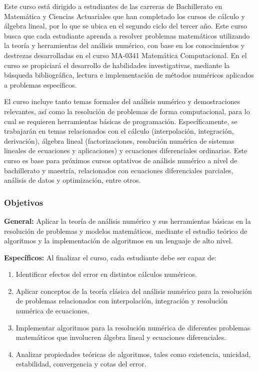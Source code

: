 \begin{refsection}
Este curso está dirigido a estudiantes de las carreras de Bachillerato en Matemática y Ciencias Actuariales que han completado los cursos de cálculo y álgebra lineal, por lo que se ubica en el segundo ciclo del tercer año. Este curso busca que cada estudiante aprenda a resolver problemas matemáticos utilizando la teoría y herramientas del análisis numérico, con base en los conocimientos y destrezas desarrolladas en el curso MA-0341 Matemática Computacional. En el curso se propiciará el desarrollo de habilidades investigativas, mediante la búsqueda bibliográfica, lectura e implementación de métodos numéricos aplicados a problemas específicos.

El curso incluye tanto temas formales del análisis numérico y demostraciones relevantes, así como la resolución de problemas de forma computacional, para lo cual se requieren herramientas básicas de programación. Específicamente, se trabajarán en temas relacionados con el cálculo (interpolación, integración, derivación), álgebra lineal (factorizaciones, resolución numérica de sistemas lineales de ecuaciones y aplicaciones) y ecuaciones diferenciales ordinarias. Este curso es base para próximos cursos optativos de análisis numérico a nivel de bachillerato y maestría, relacionados con ecuaciones diferenciales parciales, análisis de datos y optimización, entre otros.

\subsubsection*{Objetivos}

\textbf{General:} 
Aplicar la teoría de análisis numérico y sus herramientas básicas en la resolución de problemas y modelos matemáticos, mediante el estudio teórico de algoritmos y la implementación de algoritmos en un lenguaje de alto nivel. 

\textbf{Específicos:}
Al finalizar el curso, cada estudiante debe ser capaz de:
\begin{enumerate}
	\item  Identificar efectos del error en distintos cálculos numéricos.
	\item Aplicar conceptos de la teoría clásica del análisis numérico para la resolución de problemas relacionados con interpolación, integración y resolución numérica de ecuaciones.
	\item Implementar algoritmos para la resolución numérica de diferentes problemas matemáticos que involucren álgebra lineal y ecuaciones diferenciales.
	\item Analizar propiedades teóricas de algoritmos, tales como existencia, unicidad, estabilidad, convergencia y cotas del error.
\end{enumerate}


\end{refsection}
